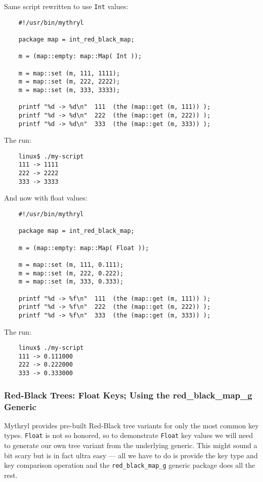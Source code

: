 Same script rewritten to use {\tt Int} values:

\begin{verbatim}
    #!/usr/bin/mythryl

    package map = int_red_black_map;

    m = (map::empty: map::Map( Int ));

    m = map::set (m, 111, 1111);
    m = map::set (m, 222, 2222);
    m = map::set (m, 333, 3333);

    printf "%d -> %d\n"  111  (the (map::get (m, 111)) );
    printf "%d -> %d\n"  222  (the (map::get (m, 222)) );
    printf "%d -> %d\n"  333  (the (map::get (m, 333)) );
\end{verbatim}

The run:

\begin{verbatim}
    linux$ ./my-script
    111 -> 1111
    222 -> 2222
    333 -> 3333
\end{verbatim}

And now with float values:

\begin{verbatim}
    #!/usr/bin/mythryl

    package map = int_red_black_map;

    m = (map::empty: map::Map( Float ));

    m = map::set (m, 111, 0.111);
    m = map::set (m, 222, 0.222);
    m = map::set (m, 333, 0.333);

    printf "%d -> %f\n"  111  (the (map::get (m, 111)) );
    printf "%d -> %f\n"  222  (the (map::get (m, 222)) );
    printf "%d -> %f\n"  333  (the (map::get (m, 333)) );
\end{verbatim}

The run:

\begin{verbatim}
    linux$ ./my-script
    111 -> 0.111000
    222 -> 0.222000
    333 -> 0.333000
\end{verbatim}

\cutend*

\subsubsection{Red-Black Trees: Float Keys; Using the red\_black\_map\_g Generic}

Mythryl provides pre-built Red-Black tree variants for only 
the most common key types.  {\tt Float} is not so honored, so 
to demonstrate {\tt Float} key values we will need to generate 
our own tree variant from the underlying generic.  This might 
sound a bit scary but is in fact ultra easy --- all we have to 
do is provide the key type and key comparison operation and 
the {\tt red\_black\_map\_g} generic package does all the rest.

